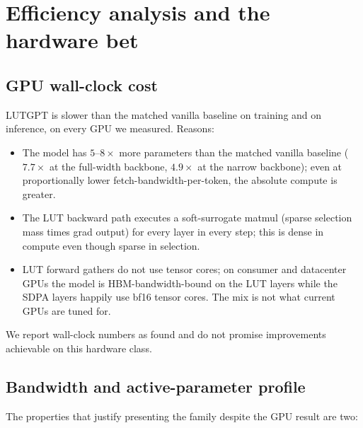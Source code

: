 \documentclass[11pt]{article}
\begin{document}
\section{Efficiency analysis and the hardware bet}
\label{sec:efficiency}

\subsection{GPU wall-clock cost}

LUTGPT is slower than the matched vanilla baseline on training and on inference, on every GPU we measured. Reasons:

\begin{itemize}[leftmargin=*,topsep=2pt,itemsep=1pt]
\item The model has $5$--$8\times$ more parameters than the matched vanilla baseline ($7.7\times$ at the full-width backbone, $4.9\times$ at the narrow backbone); even at proportionally lower fetch-bandwidth-per-token, the absolute compute is greater.
\item The LUT backward path executes a soft-surrogate matmul (sparse selection mass times grad output) for every layer in every step; this is dense in compute even though sparse in selection.
\item LUT forward gathers do not use tensor cores; on consumer and datacenter GPUs the model is HBM-bandwidth-bound on the LUT layers while the SDPA layers happily use bf16 tensor cores. The mix is not what current GPUs are tuned for.
\end{itemize}

We report wall-clock numbers as found and do not promise improvements achievable on this hardware class.

\subsection{Bandwidth and active-parameter profile}

The properties that justify presenting the family despite the GPU result are two:
\end{document}

